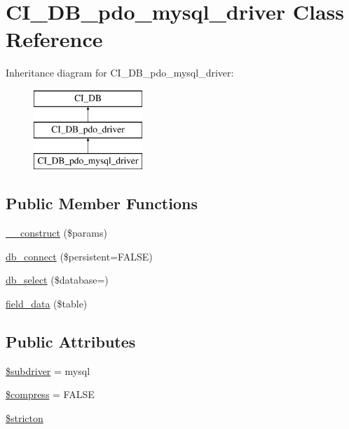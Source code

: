 \hypertarget{class_c_i___d_b__pdo__mysql__driver}{}\section{C\+I\+\_\+\+D\+B\+\_\+pdo\+\_\+mysql\+\_\+driver Class Reference}
\label{class_c_i___d_b__pdo__mysql__driver}
Inheritance diagram for C\+I\+\_\+\+D\+B\+\_\+pdo\+\_\+mysql\+\_\+driver\+:\begin{figure}[H]
\begin{center}
\leavevmode
\includegraphics[height=3.000000cm]{class_c_i___d_b__pdo__mysql__driver}
\end{center}
\end{figure}
\subsection*{Public Member Functions}
\begin{DoxyCompactItemize}
\item 
\mbox{\hyperlink{class_c_i___d_b__pdo__mysql__driver_a9162320adff1a1a4afd7f2372f753a3e}{\+\_\+\+\_\+construct}} (\$params)
\item 
\mbox{\hyperlink{class_c_i___d_b__pdo__mysql__driver_a52bf595e79e96cc0a7c907a9b45aeb4d}{db\+\_\+connect}} (\$persistent=F\+A\+L\+SE)
\item 
\mbox{\hyperlink{class_c_i___d_b__pdo__mysql__driver_a18ae9c21870b30b45337c5e3626190cc}{db\+\_\+select}} (\$database=\textquotesingle{}\textquotesingle{})
\item 
\mbox{\hyperlink{class_c_i___d_b__pdo__mysql__driver_a90355121e1ed009e0efdbd544ab56efa}{field\+\_\+data}} (\$table)
\end{DoxyCompactItemize}
\subsection*{Public Attributes}
\begin{DoxyCompactItemize}
\item 
\mbox{\hyperlink{class_c_i___d_b__pdo__mysql__driver_a1322ca756348b11d080cb7a4f590de15}{\$subdriver}} = \textquotesingle{}mysql\textquotesingle{}
\item 
\mbox{\hyperlink{class_c_i___d_b__pdo__mysql__driver_abf799de0d30288b91ee73769281dd69d}{\$compress}} = F\+A\+L\+SE
\item 
\mbox{\hyperlink{class_c_i___d_b__pdo__mysql__driver_afb42d9811bec1da94506e5764e1439e0}{\$stricton}}
\end{DoxyCompactItemize}
